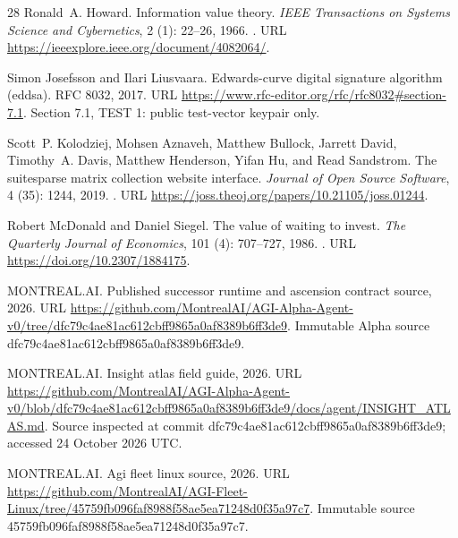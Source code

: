 \documentclass[11pt,a4paper]{article}
\begin{document}
\begin{thebibliography}{28}
Ronald~A. Howard.
\newblock Information value theory.
\newblock \emph{IEEE Transactions on Systems Science and Cybernetics},
  2 (1): 22--26, 1966.
\newblock {}.
\newblock URL \url{https://ieeexplore.ieee.org/document/4082064/}.

Simon Josefsson and Ilari Liusvaara.
\newblock Edwards-curve digital signature algorithm (eddsa).
\newblock RFC 8032, 2017.
\newblock URL \url{https://www.rfc-editor.org/rfc/rfc8032#section-7.1}.
\newblock Section 7.1, TEST 1: public test-vector keypair only.

Scott~P. Kolodziej, Mohsen Aznaveh, Matthew Bullock, Jarrett David, Timothy~A.
  Davis, Matthew Henderson, Yifan Hu, and Read Sandstrom.
\newblock The suitesparse matrix collection website interface.
\newblock \emph{Journal of Open Source Software}, 4 (35):
  1244, 2019.
\newblock {}.
\newblock URL \url{https://joss.theoj.org/papers/10.21105/joss.01244}.

Robert McDonald and Daniel Siegel.
\newblock The value of waiting to invest.
\newblock \emph{The Quarterly Journal of Economics}, 101 (4):
  707--727, 1986.
\newblock {}.
\newblock URL \url{https://doi.org/10.2307/1884175}.

{MONTREAL.AI}.
\newblock Published successor runtime and ascension contract source,
  2026{}.
\newblock URL
  \url{https://github.com/MontrealAI/AGI-Alpha-Agent-v0/tree/dfc79c4ae81ac612cbff9865a0af8389b6ff3de9}.
\newblock Immutable Alpha source dfc79c4ae81ac612cbff9865a0af8389b6ff3de9.

{MONTREAL.AI}.
\newblock Insight atlas field guide, 2026{}.
\newblock URL
  \url{https://github.com/MontrealAI/AGI-Alpha-Agent-v0/blob/dfc79c4ae81ac612cbff9865a0af8389b6ff3de9/docs/agent/INSIGHT_ATLAS.md}.
\newblock Source inspected at commit dfc79c4ae81ac612cbff9865a0af8389b6ff3de9;
  accessed 24 October 2026 UTC.

{MONTREAL.AI}.
\newblock Agi fleet linux source, 2026{}.
\newblock URL
  \url{https://github.com/MontrealAI/AGI-Fleet-Linux/tree/45759fb096faf8988f58ae5ea71248d0f35a97c7}.
\newblock Immutable source 45759fb096faf8988f58ae5ea71248d0f35a97c7.


\end{thebibliography}
\end{document}
